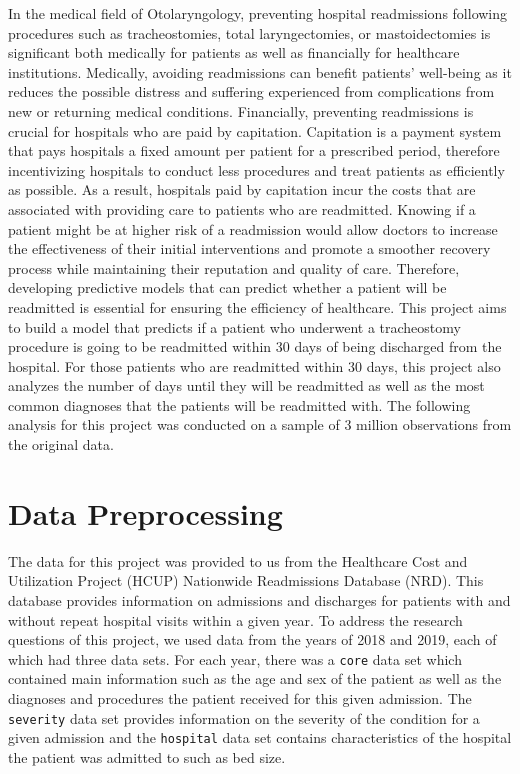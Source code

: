 \documentclass[sn-basic,pdflatex]{sn-jnl}
\theoremstyle{remark}
\theoremstyle{definition}
\begin{document}
In the medical field of Otolaryngology, preventing hospital readmissions
following procedures such as tracheostomies, total laryngectomies, or
mastoidectomies is significant both medically for patients as well as
financially for healthcare institutions. Medically, avoiding
readmissions can benefit patients' well-being as it reduces the possible
distress and suffering experienced from complications from new or
returning medical conditions. Financially, preventing readmissions is
crucial for hospitals who are paid by capitation. Capitation is a
payment system that pays hospitals a fixed amount per patient for a
prescribed period, therefore incentivizing hospitals to conduct less
procedures and treat patients as efficiently as possible. As a result,
hospitals paid by capitation incur the costs that are associated with
providing care to patients who are readmitted. Knowing if a patient
might be at higher risk of a readmission would allow doctors to increase
the effectiveness of their initial interventions and promote a smoother
recovery process while maintaining their reputation and quality of care.
Therefore, developing predictive models that can predict whether a
patient will be readmitted is essential for ensuring the efficiency of
healthcare. \newline \newline This project aims to build a model that
predicts if a patient who underwent a tracheostomy procedure is going to
be readmitted within 30 days of being discharged from the hospital. For
those patients who are readmitted within 30 days, this project also
analyzes the number of days until they will be readmitted as well as the
most common diagnoses that the patients will be readmitted with. The
following analysis for this project was conducted on a sample of 3
million observations from the original data.

\hypertarget{sec2}{%
\section{Data Preprocessing}\label{sec2}}

The data for this project was provided to us from the Healthcare Cost
and Utilization Project (HCUP) Nationwide Readmissions Database (NRD).
This database provides information on admissions and discharges for
patients with and without repeat hospital visits within a given year. To
address the research questions of this project, we used data from the
years of 2018 and 2019, each of which had three data sets. For each
year, there was a \texttt{core} data set which contained main
information such as the age and sex of the patient as well as the
diagnoses and procedures the patient received for this given admission.
The \texttt{severity} data set provides information on the severity of
the condition for a given admission and the \texttt{hospital} data set
contains characteristics of the hospital the patient was admitted to
such as bed size.
\end{document}
